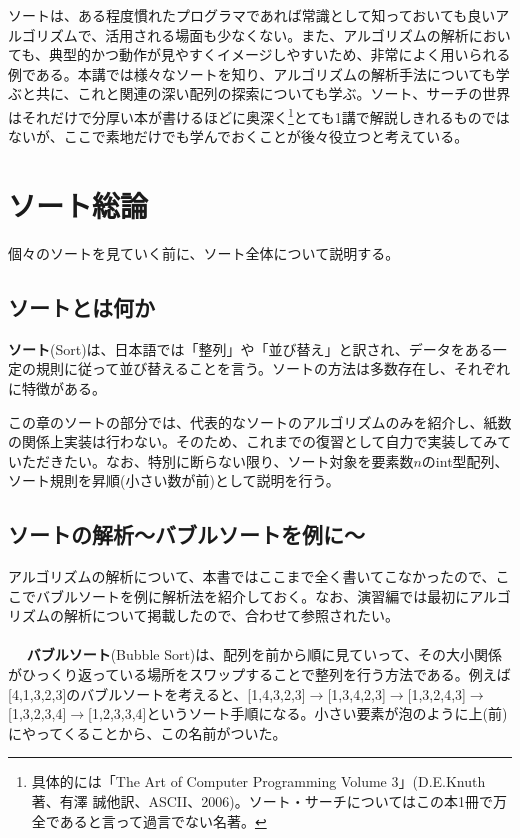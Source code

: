 ソートは、ある程度慣れたプログラマであれば常識として知っておいても良いアルゴリズムで、活用される場面も少なくない。また、アルゴリズムの解析においても、典型的かつ動作が見やすくイメージしやすいため、非常によく用いられる例である。本講では様々なソートを知り、アルゴリズムの解析手法についても学ぶと共に、これと関連の深い配列の探索についても学ぶ。ソート、サーチの世界はそれだけで分厚い本が書けるほどに奥深く\footnote{具体的には「The Art of Computer Programming Volume 3」(D.E.Knuth著、有澤 誠他訳、ASCII、2006)。ソート・サーチについてはこの本1冊で万全であると言って過言でない名著。}とても1講で解説しきれるものではないが、ここで素地だけでも学んでおくことが後々役立つと考えている。
\section{ソート総論}
個々のソートを見ていく前に、ソート全体について説明する。
\subsection{ソートとは何か}
\textbf{ソート}(Sort)は、日本語では「整列」や「並び替え」と訳され、データをある一定の規則に従って並び替えることを言う。ソートの方法は多数存在し、それぞれに特徴がある。

この章のソートの部分では、代表的なソートのアルゴリズムのみを紹介し、紙数の関係上実装は行わない。そのため、これまでの復習として自力で実装してみていただきたい。なお、特別に断らない限り、ソート対象を要素数$n$のint型配列、ソート規則を昇順(小さい数が前)として説明を行う。
\subsection{ソートの解析〜バブルソートを例に〜}
アルゴリズムの解析について、本書ではここまで全く書いてこなかったので、ここでバブルソートを例に解析法を紹介しておく。なお、演習編では最初にアルゴリズムの解析について掲載したので、合わせて参照されたい。
\\ \\　
\textbf{バブルソート}(Bubble Sort)は、配列を前から順に見ていって、その大小関係がひっくり返っている場所をスワップすることで整列を行う方法である。例えば[4,1,3,2,3]のバブルソートを考えると、[1,4,3,2,3]$\rightarrow$[1,3,4,2,3]$\rightarrow$[1,3,2,4,3]$\rightarrow$[1,3,2,3,4]$\rightarrow$[1,2,3,3,4]というソート手順になる。小さい要素が泡のように上(前)にやってくることから、この名前がついた。

